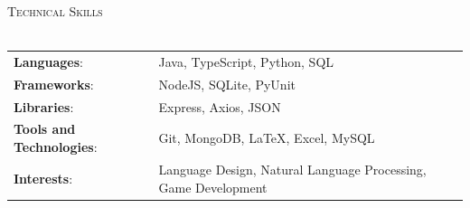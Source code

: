 \documentclass[letterpaper]{article} %
\newcommand{\lineunder} {
    \vspace*{-8pt} \\
    \hspace*{-18pt} \hrulefill \\
}
\newcommand{\header} [1] {
    {\hspace*{-18pt}\vspace*{6pt} \textsc{#1}}
    \vspace*{-6pt} \lineunder
}
\begin{document}
\newpage
\header{Technical Skills}
\begin{tabular}{ l l }
    \textbf{Languages}:              & Java, TypeScript, Python, SQL \\
    \textbf{Frameworks}:             & NodeJS, SQLite, PyUnit \\
    \textbf{Libraries}:              & Express, Axios, JSON \\
    \textbf{Tools and Technologies}: & Git, MongoDB, LaTeX, Excel, MySQL \\
    \textbf{Interests}:              & Language Design, Natural Language Processing, Game Development \\
\end{tabular}
\vspace{4mm}
\end{document}
